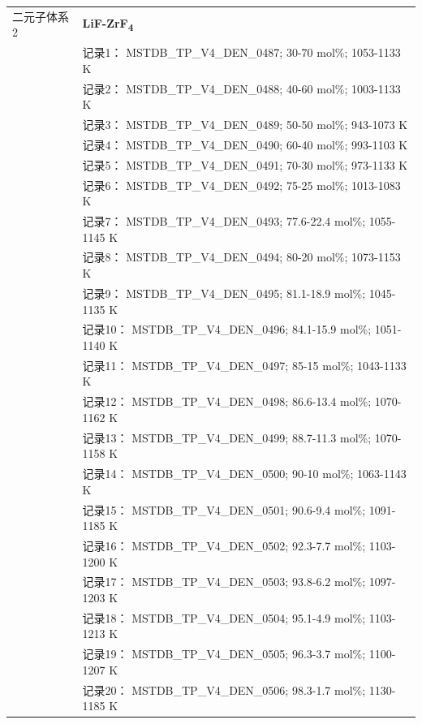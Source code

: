 \documentclass[12pt]{article}
\begin{document}
{\begin{longtable}[]{@{}
  >{\raggedright\arraybackslash}p{}
  >{\raggedright\arraybackslash}p{}@{}}
二元子体系 2  & \textbf{LiF-ZrF\textsubscript{4}} \\
 & 记录1： MSTDB\_TP\_V4\_DEN\_0487; 30-70 mol\%; 1053-1133 K \\
 & 记录2： MSTDB\_TP\_V4\_DEN\_0488; 40-60 mol\%; 1003-1133 K \\
 & 记录3： MSTDB\_TP\_V4\_DEN\_0489; 50-50 mol\%; 943-1073 K \\
 & 记录4： MSTDB\_TP\_V4\_DEN\_0490; 60-40 mol\%; 993-1103 K \\
 & 记录5： MSTDB\_TP\_V4\_DEN\_0491; 70-30 mol\%; 973-1133 K \\
 & 记录6： MSTDB\_TP\_V4\_DEN\_0492; 75-25 mol\%; 1013-1083 K \\
 & 记录7： MSTDB\_TP\_V4\_DEN\_0493; 77.6-22.4 mol\%; 1055-1145 K \\
 & 记录8： MSTDB\_TP\_V4\_DEN\_0494; 80-20 mol\%; 1073-1153 K \\
 & 记录9： MSTDB\_TP\_V4\_DEN\_0495; 81.1-18.9 mol\%; 1045-1135 K \\
 & 记录10： MSTDB\_TP\_V4\_DEN\_0496; 84.1-15.9 mol\%; 1051-1140 K \\
 & 记录11： MSTDB\_TP\_V4\_DEN\_0497; 85-15 mol\%; 1043-1133 K \\
 & 记录12： MSTDB\_TP\_V4\_DEN\_0498; 86.6-13.4 mol\%; 1070-1162 K \\
 & 记录13： MSTDB\_TP\_V4\_DEN\_0499; 88.7-11.3 mol\%; 1070-1158 K \\
 & 记录14： MSTDB\_TP\_V4\_DEN\_0500; 90-10 mol\%; 1063-1143 K \\
 & 记录15： MSTDB\_TP\_V4\_DEN\_0501; 90.6-9.4 mol\%; 1091-1185 K \\
 & 记录16： MSTDB\_TP\_V4\_DEN\_0502; 92.3-7.7 mol\%; 1103-1200 K \\
 & 记录17： MSTDB\_TP\_V4\_DEN\_0503; 93.8-6.2 mol\%; 1097-1203 K \\
 & 记录18： MSTDB\_TP\_V4\_DEN\_0504; 95.1-4.9 mol\%; 1103-1213 K \\
 & 记录19： MSTDB\_TP\_V4\_DEN\_0505; 96.3-3.7 mol\%; 1100-1207 K \\
 & 记录20： MSTDB\_TP\_V4\_DEN\_0506; 98.3-1.7 mol\%; 1130-1185 K  \\


\end{longtable}}
\end{document}
